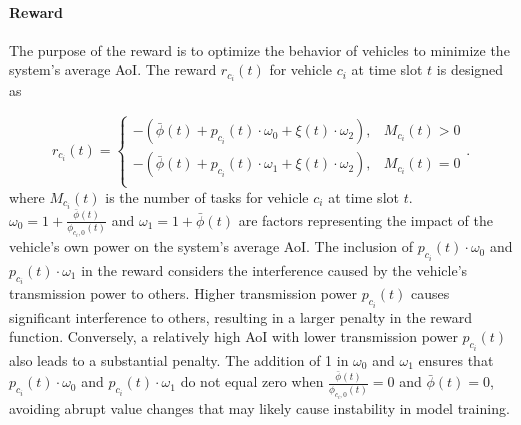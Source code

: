 \documentclass[lettersize,journal,onecolumn]{IEEEtran}
\begin{document}
\paragraph{Reward}
The purpose of the reward is to optimize the behavior of vehicles to minimize the system's average AoI. The reward ${{r}_{{{c}_{i}}}}(t)$ for vehicle ${{{c}}_{i}}$ at time slot $t$ is designed as

\begin{equation}
{{r}_{{{c}_{i}}}}(t)=\left\{ \begin{array}{*{35}{l}}
   -\left( \bar{\phi }(t)+{{p}_{{{c}_{i}}}}(t)\cdot {{\omega }_{0}}+\xi (t)\cdot {{\omega }_{{2}}} \right), & {{M}_{{{c}_{i}}}}(t)>0  \\
   -\left( \bar{\phi }(t)+{{p}_{{{c}_{i}}}}(t)\cdot {{\omega }_{1}}+\xi (t)\cdot {{\omega }_{{2}}} \right), & {{M}_{{{c}_{i}}}}(t)=0  \\
\end{array} \right.
\label{eq23}.
\end{equation}
where ${{M}_{{{{c}}_{i}}}}(t)$ is the number of tasks for vehicle ${{{c}}_{i}}$ at time slot $t$. ${{\omega }_{0}}=1+\frac{\bar{\phi }(t)}{{{\phi }_{{{{c}}_{i}},0}}\left( t \right)}$ and ${{\omega }_{1}}=1+\bar{\phi }(t)$ are factors representing the impact of the vehicle's own power on the system's average AoI. The inclusion of ${{p}_{{{c}_{i}}}}(t)\cdot {{\omega }_{0}}$ and ${{p}_{{{c}_{i}}}}(t)\cdot {{\omega }_{1}}$ in the reward considers the interference caused by the vehicle's transmission power to others. Higher transmission power ${{p}_{{{c}_{i}}}}(t)$ causes significant interference to others, resulting in a larger penalty in the reward function. Conversely, a relatively high AoI with lower transmission power ${{p}_{{{c}_{i}}}}(t)$ also leads to a substantial penalty. The addition of 1 in ${{\omega }_{0}}$ and ${{\omega }_{1}}$ ensures that ${{p}_{{{c}_{i}}}}(t)\cdot {{\omega }_{0}}$ and ${{p}_{{{c}_{i}}}}(t)\cdot {{\omega }_{1}}$ do not equal zero when $\frac{\bar{\phi }(t)}{{{\phi }_{{{{c}}_{i}},0}}\left( t \right)} = 0$ and $\bar{\phi }(t) = 0$, avoiding abrupt value changes that may likely cause instability in model training.
\end{document}
